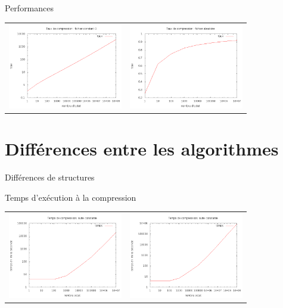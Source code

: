 \documentclass[french]{beamer}
\begin{document}
\begin{frame}{Performances}
	\begin{center}
	\begin{tabular}{l | l}
	\includegraphics[width=5cm]{LZConstant.png} & 
	\includegraphics[width=5cm]{LZAleatoire.png}
	\end{tabular}
	\end{center}
\end{frame}



\section{Différences entre les algorithmes}
\begin{frame}{Différences de structures}
	\begin{center}
	\end{center}
\end{frame}
\begin{frame}{Temps d'exécution à la compression} 
	\begin{center}
	\begin{tabular}{l | l}
	\includegraphics[width=5cm]{tempsChC.png} & 
	\includegraphics[width=5cm]{tempsClzC.png}
	\end{tabular}
		\end{center}
\end{frame}
	
\end{document}

